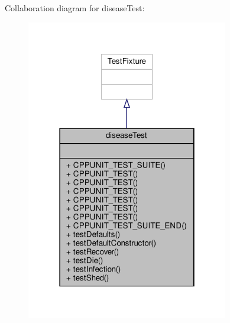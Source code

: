 Collaboration diagram for disease\+Test\+:\nopagebreak
\begin{figure}[H]
\begin{center}
\leavevmode
\includegraphics[width=250pt]{classdiseaseTest__coll__graph}
\end{center}
\end{figure}
